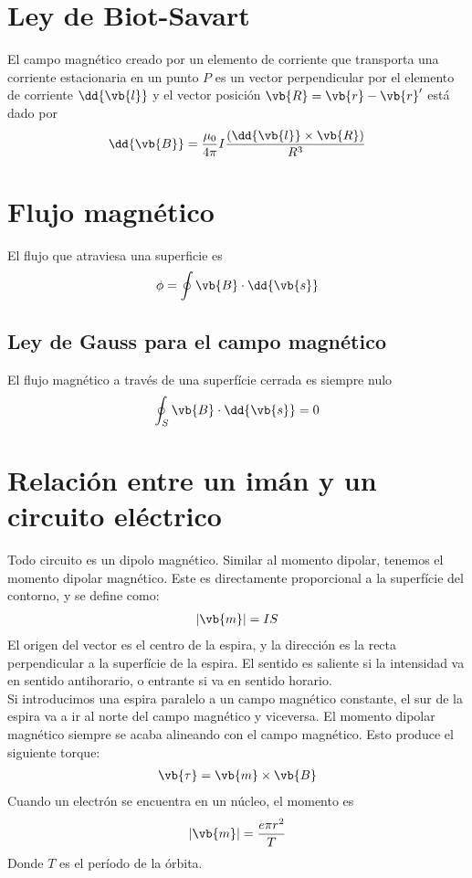 \documentclass{./FisicaII.tex}
\begin{document}
\section{Ley de Biot-Savart}
El campo magnético creado por un elemento de corriente que transporta
una corriente estacionaria en un punto $P$ es un vector perpendicular
por el elemento de corriente $\dd{\vb{l}}$ y el vector posición
$\vb{R} = \vb{r} - \vb{r}'$ está dado por
\begin{equation}
	\begin{split}
		\dd{\vb{B}} = \frac{\mu_{0}}{4 \pi} I\frac{(\dd{\vb{l}}\times \vb{R})}{R^{3}}
	\end{split}
\end{equation}
\section{Flujo magnético}
El flujo que atraviesa una superficie es
\begin{equation}
	\begin{split}
		\phi = \oint \vb{B} \cdot \dd{\vb{s}}
	\end{split}
\end{equation}
\subsection{Ley de Gauss para el campo magnético}
El flujo magnético a través de una superfície cerrada es siempre nulo
\begin{equation}
	\begin{split}
		\oint_{S} \vb{B} \cdot \dd{\vb{s}} = 0
	\end{split}
\end{equation}
\section{Relación entre un imán y un circuito eléctrico}
Todo circuito es un dipolo magnético. Similar al momento dipolar, tenemos el momento
dipolar magnético. Este es directamente proporcional a la superfície del contorno,
y se define como:
\begin{equation}
	\begin{split}
		| \vb{m}| = I S
	\end{split}
\end{equation}
El origen del vector es el centro de la espira, y la dirección es la recta perpendicular
a la superfície de la espira. El sentido es saliente si la intensidad va en sentido
antihorario, o entrante si va en sentido horario.\\
Si introducimos una espira paralelo a un campo magnético constante, el sur de la espira va
a ir al norte del campo magnético y viceversa. El momento dipolar magnético siempre se
acaba alineando con el campo magnético. Esto produce el siguiente torque:
\begin{equation}
	\begin{split}
		\vb{\tau} = \vb{m} \times \vb{B}
	\end{split}
\end{equation}
Cuando un electrón se encuentra en un núcleo, el momento es
\[
	|\vb{m}| = \frac{e \pi r ^{2}}{T}
\]
Donde $T$ es el período de la órbita. 
\end{document}
